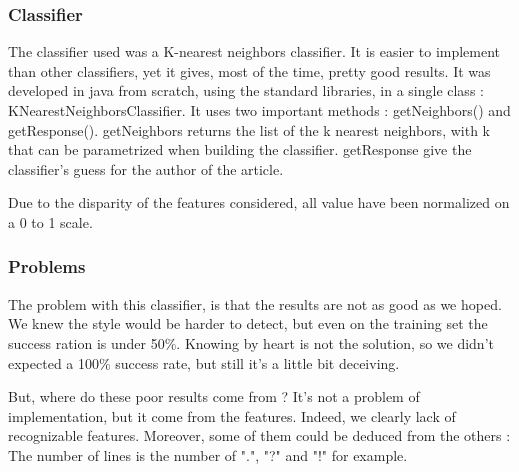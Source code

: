 \label{lab:clas1}
\subsubsection{Classifier}

The classifier used was a K-nearest neighbors classifier. It is easier to implement than other classifiers, yet it gives, most of the time, pretty good results.
It was developed in java from scratch, using the standard libraries, in a single class : KNearestNeighborsClassifier. It uses two important methods : getNeighbors() and getResponse().
getNeighbors returns the list of the k nearest neighbors, with k that can be parametrized when building the classifier.
getResponse give the classifier's guess for the author of the article.

Due to the disparity of the features considered, all value have been normalized on a 0 to 1 scale.


\subsubsection{Problems}
The problem with this classifier, is that the results are not as good as we hoped. We knew the style would be harder to detect, but even on the training set the success ration is under 50\%. Knowing by heart is not the solution, so we didn't expected a 100\% success rate, but still it's a little bit deceiving. 

But, where do these poor results come from ? It's not a problem of implementation, but it come from the features. Indeed, we clearly lack of recognizable features. Moreover, some of them could be deduced from the others : The number of lines is the number of ".", "?" and "!" for example.